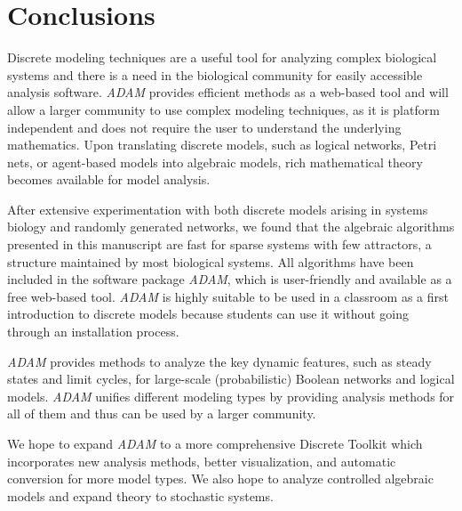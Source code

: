 \documentclass[10pt]{bmc_article}
\newenvironment{bmcformat}{\fussy\setboolean{publ}{true}}{\fussy}
\begin{document}
\begin{bmcformat}
    

\section*{Conclusions}
Discrete modeling techniques are a useful tool for analyzing complex biological systems and there is a need in the biological community for easily accessible analysis software. {\it ADAM} provides efficient methods as a web-based tool and will allow a larger community to use complex modeling techniques, as it is platform independent and does not require the user to understand the underlying mathematics.
Upon translating discrete models, such as logical networks,
Petri nets, or agent-based models into algebraic models, rich mathematical
theory becomes available for model analysis.

After extensive experimentation with both discrete models arising in systems biology and randomly generated networks, we found that the algebraic algorithms presented in this manuscript
are fast for sparse systems with few attractors, a structure maintained by most biological
systems. All algorithms have been included in the software package {\it ADAM}\cite{ADAM},
which is user-friendly and available as a free web-based tool.
{\it ADAM} is highly suitable to be used in a classroom as a first
introduction to discrete models because students can use it without going through an installation process.

{\it ADAM} provides methods to analyze the key dynamic features, such as steady states and limit cycles, for large-scale (probabilistic) Boolean networks and logical models. {\it ADAM} unifies different modeling types by providing analysis methods for all of them and thus can be used by a larger community.

We hope to expand {\it ADAM} to a more comprehensive Discrete Toolkit which incorporates new analysis methods, better visualization, and automatic conversion for more model types.
We also hope to analyze controlled algebraic models and expand theory to stochastic systems.




  

\end{bmcformat}
\end{document}
